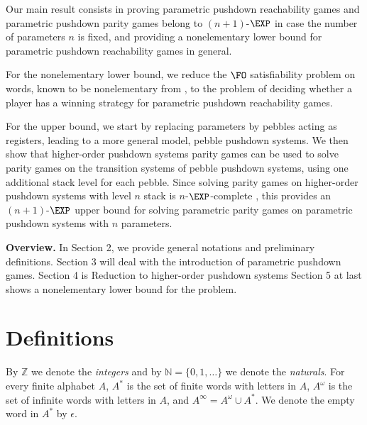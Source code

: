 \documentclass[a4paper,UKenglish,cleveref, autoref, thm-restate]{lipics-v2021}
\newcommand{\Z}{\mathbb{Z}}
\newcommand{\N}{\mathbb{N}}
\newcommand{\MSO}{\textsc{MSO}}
\begin{document}
Our main result consists in
proving parametric pushdown reachability games
and parametric pushdown parity games belong to $(n+1)$-$\EXP$ in case the number of parameters
$n$ is fixed,
and providing a nonelementary lower bound for parametric pushdown reachability games in general.



	For the nonelementary lower bound,
we reduce the $\FO$ satisfiability problem on words, known to be nonelementary
from \cite{Sto74}, to the
problem of deciding whether a player has a winning strategy for parametric pushdown reachability games. 

	For the upper bound, we start by replacing parameters by pebbles acting as registers, leading to a more general model, pebble pushdown systems.
 We then show that higher-order pushdown systems parity games can be used to solve parity games on
 the transition systems of pebble pushdown systems,
using one additional stack level for each pebble.
 Since solving parity games on higher-order pushdown systems with level $n$ stack is $n$-$\EXP$-complete \cite{ Cach03, cachat2007complexity}, this provides an $(n+1)$-$\EXP$ upper bound for solving parametric parity games on parametric pushdown systems with $n$ parameters.



{\bf Overview. }
In Section 2, we provide general notations and preliminary definitions. 
Section 3 will deal with the introduction of  parametric pushdown games.
Section 4 is Reduction to higher-order pushdown systems
Section 5 at last shows a nonelementary lower bound for the problem.




\section{Definitions}


\newcommand{\LCM}{\mathsf{LCM}}
\newcommand{\LOGSPACE}{\mathsf{LOGSPACE}}
\renewcommand{\MSO}{\mathsf{MSO}}
\newcommand{\SO}{\mathsf{SO}}

By $\Z $ we denote the {\em integers} and by $\N=\{0,1,\ldots\}$ we denote the {\em naturals}.
For every finite alphabet $A$, $A^*$ is the set of finite
words with letters in  $A$, $A^\omega$ is the set of infinite words with letters in $A$, and
 $A^\infty = A^\omega \cup A^*$. We denote the empty word in $A^*$ by $\epsilon$.
\end{document}

